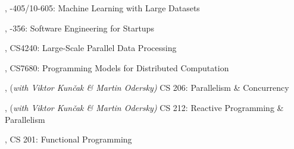 \documentclass[9pt]{article}
\begin{document}
,  
\newline{}-405/10-605: Machine Learning with Large Datasets 
\bigskip


,  
\newline{}-356: Software Engineering for Startups 
\bigskip

,  
\newline\noindent CS4240: Large-Scale Parallel Data Processing 
\bigskip

, 
\newline\noindent CS7680: Programming Models for Distributed Computation 
\bigskip

, {(\em with Viktor Kun\v cak \& Martin Odersky)} 
\newline\noindent CS 206: Parallelism \& Concurrency 
\bigskip

, {(\em with Viktor Kun\v cak \& Martin Odersky)} 
\newline\noindent CS 212: Reactive Programming \& Parallelism 
\bigskip

, 
\newline\noindent CS 201: Functional Programming 
\bigskip

\end{document}
